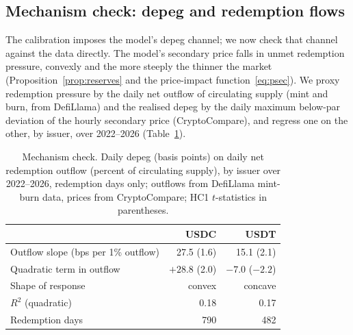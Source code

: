 \subsection{Mechanism check: depeg and redemption flows}\label{sub:mechanism_check}

The calibration imposes the model's depeg channel; we now check that channel against the data directly. The model's secondary price falls in unmet redemption pressure, convexly and the more steeply the thinner the market (Proposition~\ref{prop:reserves} and the price-impact function~\eqref{eq:psec}). We proxy redemption pressure by the daily net outflow of circulating supply (mint and burn, from DefiLlama) and the realised depeg by the daily maximum below-par deviation of the hourly secondary price (CryptoCompare), and regress one on the other, by issuer, over 2022--2026 (Table~\ref{tab:mechanism_check}).

\begin{table}[H]
\centering
\caption{Mechanism check. Daily depeg (basis points) on daily net redemption outflow (percent of circulating supply), by issuer over 2022--2026, redemption days only; outflows from DefiLlama mint-burn data, prices from CryptoCompare; HC1 $t$-statistics in parentheses.}\label{tab:mechanism_check}
\begin{tabular}{lrr}
\toprule
 & USDC & USDT \\
\midrule
Outflow slope (bps per 1\% outflow) & 27.5 \;(1.6) & 15.1 \;(2.1) \\
Quadratic term in outflow           & $+28.8$ \;(2.0) & $-7.0$ \;($-2.2$) \\
Shape of response                    & convex & concave \\
$R^2$ (quadratic)                    & 0.18 & 0.17 \\
Redemption days                      & 790 & 482 \\
\bottomrule
\end{tabular}
\end{table}

